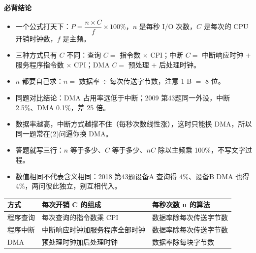 \documentclass[10pt,a4paper]{ctexart}
\begin{document}




\textbf{必背结论}

\begin{itemize}

\item 一个公式打天下：$P=\dfrac{n\times C}{f}\times100\%$，$n$ 是每秒 I/O 次数，$C$ 是每次的 CPU 开销时钟数，$f$ 是主频。

\item 三种方式只有 $C$ 不同：查询 $C=$ 指令数 $\times$ CPI；中断 $C=$ 中断响应时钟 $+$ 服务程序指令数 $\times$ CPI；DMA $C=$ 预处理 $+$ 后处理时钟。

\item $n$ 都要自己求：$n=$ 数据率 $\div$ 每次传送字节数，注意 1 B $=$ 8 位。

\item 同题对比结论：DMA 占用率远低于中断；2009 第43题同一外设，中断 2.5\%、DMA 0.1\%，差 25 倍。

\item 数据率越高，中断方式越撑不住（每秒次数线性涨），这时只能换 DMA，所以同一题常在(2)问逼你换 DMA。

\item 答题就写三行：$n$ 等于多少、$C$ 等于多少、$nC$ 除以主频乘 100\%，不写文字过程。

\item 数值相同不代表含义相同：2018 第43题设备A 查询得 4\%、设备B DMA 也得 4\%，两问彼此独立，别互相代入。

\end{itemize}

\begin{center}\small
\begin{tabularx}{\linewidth}{@{}l>{\raggedright\arraybackslash}X>{\raggedright\arraybackslash}X@{}}
\toprule
方式 & 每次开销 C 的组成 & 每秒次数 n 的算法 \\
\midrule
程序查询 & 每次查询的指令数乘 CPI & 数据率除每次传送字节数 \\
程序中断 & 中断响应时钟加服务程序全部时钟 & 数据率除每次传送字节数 \\
DMA & 预处理时钟加后处理时钟 & 数据率除每块字节数 \\
\bottomrule
\end{tabularx}
\end{center}
\end{document}
